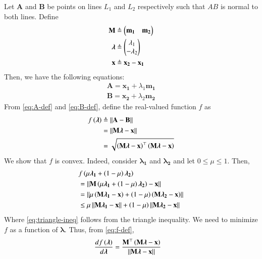 \documentclass[journal,12pt,twocolumn]{IEEEtran}
\renewcommand{\vec}[1]{\boldsymbol{\mathbf{#1}}}
\begin{document}
\begin{enumerate}
    \solution Let $\vec{A}$ and $\vec{B}$ be points on lines $L_1$ and $L_2$
    respectively such that $AB$ is normal to both lines. Define
    \begin{align}
        \vec{M} &\triangleq \myvec{\vec{m_1} & \vec{m_2}} \label{eq:M-def} \\
        \vec{\lambda} &\triangleq \myvec{\lambda_1\\-\lambda_2} \label{eq:lambda-def} \\
        \vec{x} &\triangleq \vec{x_2} - \vec{x_1} \label{eq:x-def}
    \end{align}
    Then, we have the following equations:
    \begin{align}
        \vec{A} = \vec{x_1} + \lambda_1\vec{m_1} \label{eq:A-def} \\
        \vec{B} = \vec{x_2} + \lambda_2\vec{m_2} \label{eq:B-def}
    \end{align}
    From \eqref{eq:A-def} and \eqref{eq:B-def}, define the real-valued function
    $f$ as
    \begin{align}
        f\brak{\vec{\lambda}} &\triangleq \norm{\vec{A}-\vec{B}} \\
                              &= \norm{\vec{M}\vec{\lambda}-\vec{x}} \\
                              &= \sqrt{\brak{\vec{M\lambda}-\vec{x}}^\top\brak{\vec{M\lambda}-\vec{x}}}
        \label{eq:f-def}
    \end{align}
    We show that $f$ is convex. Indeed, consider $\vec{\lambda_1}$ and 
    $\vec{\lambda_2}$ and let $0 \le \mu \le 1$. Then,
    \begin{align}
        &f\brak{\mu\vec{\lambda_1}+\brak{1-\mu}\vec{\lambda_2}} \\
        &= \norm{\vec{M}\brak{\mu\vec{\lambda_1}+\brak{1-\mu}\vec{\lambda_2}}-\vec{x}} \\
        &= \norm{\mu\brak{\vec{M}\vec{\lambda_1}-\vec{x}}+\brak{1-\mu}\brak{\vec{M}\vec{\lambda_2}-\vec{x}}} \\
        &\le \mu\norm{\vec{M\lambda_1}-\vec{x}} + \brak{1-\mu}\norm{\vec{M\lambda_2}-\vec{x}}
        \label{eq:triangle-ineq}
    \end{align}
    Where \eqref{eq:triangle-ineq} follows from the triangle inequality.
    We need to minimize $f$ as a function of $\vec{\lambda}$. Thus, from
    \eqref{eq:f-def},
    \begin{align}
    \frac{df\brak{\vec{\lambda}}}{d\vec{\lambda}} &= \frac{\vec{M}^\top\brak{\vec{M\lambda}-\vec{x}}}{\norm{\vec{M\lambda}-\vec{x}}}

\end{align}
\end{enumerate}
\end{document}
